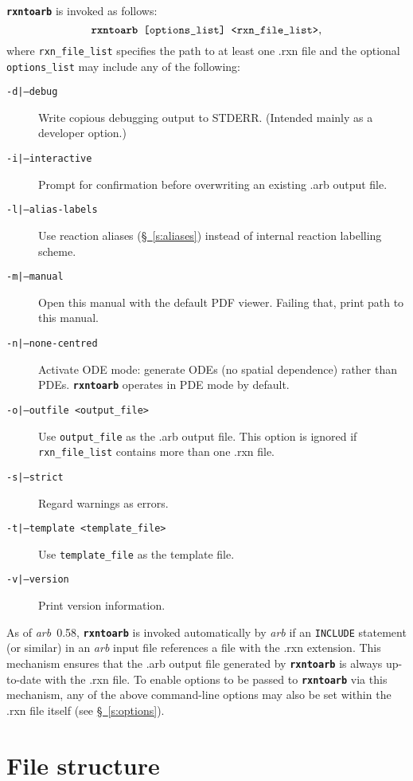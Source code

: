 \documentclass[fontsize=12pt,
               captions=abovetable,
               numbers=noenddot,
              ]{scrartcl}
\newcommand{\sect}[1]{\hyperref[s:#1]{\S~\ref{s:#1}}}
\newcommand{\rxntoarb}{\texttt{\textbf{rxntoarb}}}
\begin{document}
\rxntoarb{} is invoked as follows:
%
\begin{equation*}
\rxntoarb{} \texttt{ [options\_list] <rxn\_file\_list>},
\end{equation*}
%
where \texttt{rxn\_file\_list} specifies the path to at least one .rxn file and the optional \texttt{options\_list} may include any of the following:
\begin{description}
\item[\texttt{-d|--debug}] Write copious debugging output to STDERR. (Intended mainly as a developer option.)
\item[\texttt{-i|--interactive}] Prompt for confirmation before overwriting an existing .arb output file.
\item[\texttt{-l|--alias-labels}] Use reaction aliases (\sect{aliases}) instead of internal reaction labelling scheme.
\item[\texttt{-m|--manual}] Open this manual with the default PDF viewer. Failing that, print path to this manual.
\item[\texttt{-n|--none-centred}] Activate ODE mode: generate ODEs (no spatial dependence) rather than PDEs. \rxntoarb{} operates in PDE mode by default.
\item[\texttt{-o|--outfile <output\_file>}] Use \texttt{output\_file} as the .arb output file. This option is ignored if \texttt{rxn\_file\_list} contains more than one .rxn file.
\item[\texttt{-s|--strict}] Regard warnings as errors.
\item[\texttt{-t|--template <template\_file>}] Use \texttt{template\_file} as the template file.
\item[\texttt{-v|--version}] Print version information.
\end{description}

As of \emph{arb}~0.58, \rxntoarb{} is invoked automatically by \emph{arb} if an \texttt{INCLUDE} statement (or similar) in an \emph{arb} input file references a file with the .rxn extension. This mechanism ensures that the .arb output file generated by \rxntoarb{} is always up-to-date with the .rxn file. To enable options to be passed to \rxntoarb{} via this mechanism, any of the above command-line options may also be set within the .rxn file itself (see \sect{options}).

\clearpage
\section{File structure \label{s:fstruct}}
\end{document}
